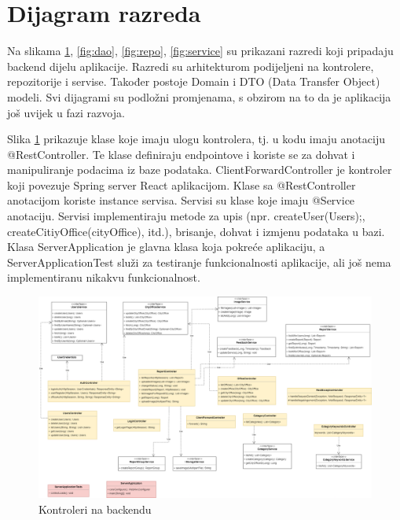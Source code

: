 			\eject
			
			
		\section{Dijagram razreda}
		
			Na slikama \ref{fig:kontroler}, \ref{fig:dao}, \ref{fig:repo}, \ref{fig:service} su prikazani razredi koji pripadaju backend dijelu aplikacije. Razredi su arhitekturom podijeljeni na kontrolere, repozitorije i servise. Također postoje Domain i DTO (Data Transfer Object) modeli. Svi dijagrami su podložni promjenama, s obzirom na to da je aplikacija još uvijek u fazi razvoja.
		
			Slika \ref{fig:kontroler} prikazuje klase koje imaju ulogu kontrolera, tj. u kodu imaju anotaciju @RestController. Te klase definiraju endpointove i koriste se za dohvat i manipuliranje podacima iz baze podataka. ClientForwardController je kontroler koji povezuje Spring server React aplikacijom. Klase sa @RestController anotacijom koriste instance servisa. Servisi su klase koje imaju @Service anotaciju. Servisi implementiraju metode za upis (npr. createUser(Users);, createCitiyOffice(cityOffice), itd.), brisanje, dohvat i izmjenu podataka u bazi. Klasa ServerApplication je glavna klasa koja pokreće aplikaciju, a ServerApplicationTest služi za testiranje funkcionalnosti aplikacije, ali još nema implementiranu nikakvu funkcionalnost.
		
			\begin{figure}[H]
				\includegraphics[width=\textwidth]{slike/controller.png} %
				\caption{Kontroleri na backendu}
				\label{fig:kontroler} %
			\end{figure}
			

